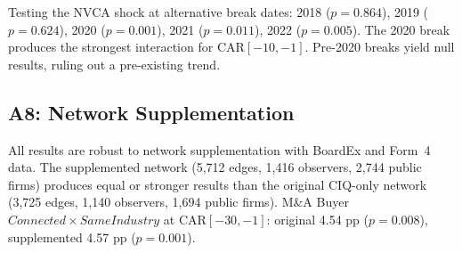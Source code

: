 Testing the NVCA shock at alternative break dates: 2018 ($p=0.864$), 2019 ($p=0.624$), 2020 ($p=0.001$), 2021 ($p=0.011$), 2022 ($p=0.005$). The 2020 break produces the strongest interaction for CAR$[-10,-1]$. Pre-2020 breaks yield null results, ruling out a pre-existing trend.

\subsection*{A8: Network Supplementation}

All results are robust to network supplementation with BoardEx and Form~4 data. The supplemented network (5,712 edges, 1,416 observers, 2,744 public firms) produces equal or stronger results than the original CIQ-only network (3,725 edges, 1,140 observers, 1,694 public firms). M\&A Buyer $Connected \times SameIndustry$ at CAR$[-30,-1]$: original 4.54 pp ($p=0.008$), supplemented 4.57 pp ($p=0.001$).